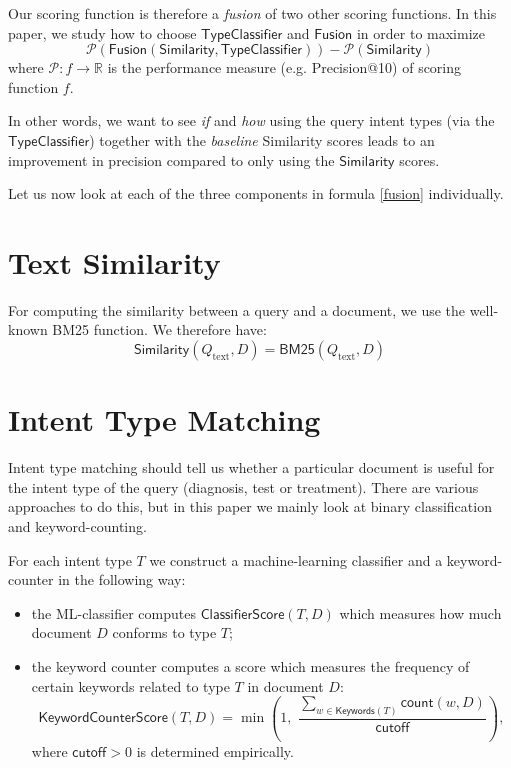 Our scoring function is therefore a \emph{fusion} of two other scoring functions.
In this paper, we study how to choose $\textsf{TypeClassifier}$ and $\textsf{Fusion}$ in order to maximize
\[
 \mathcal{P}(\textsf{Fusion}(\textsf{Similarity}, \textsf{TypeClassifier})) - \mathcal{P}(\textsf{Similarity})
\]
where $\mathcal{P}: f \rightarrow \mathbb{R}$ is the performance measure (e.g. Precision@10) of scoring function $f$.

In other words, we want to see \emph{if} and \emph{how} using the query intent types (via the
$\textsf{TypeClassifier}$) together with the \emph{baseline} \textsf{Similarity} scores
leads to an improvement in precision compared to only using the $\textsf{Similarity}$ scores.

Let us now look at each of the three components in formula \ref{fusion} individually.

\section{Text Similarity}
For computing the similarity between a query and a document, we use the well-known BM25 function\cite{bm25}.
We therefore have:
\begin{equation}\label{bm25-formula}
 \textsf{Similarity}(Q_{\text{text}}, D) = \textsf{BM25}(Q_{\text{text}},D)%
\end{equation}


\section{Intent Type Matching}
Intent type matching should tell us whether a particular document is useful for the intent type of the query 
(diagnosis, test or treatment). There are various approaches to do this, but in this paper we mainly look at
binary classification and keyword-counting.

For each intent type $T$ we construct a machine-learning classifier and a keyword-counter in the following way:
\begin{itemize}
 \item the ML-classifier computes $\textsf{ClassifierScore}(T,D)$ which measures how much document $D$ conforms to type $T$;
 \item the keyword counter computes a score which measures the frequency of certain keywords related to type $T$ in document $D$:
 \begin{equation}\label{basic-formula}
  \textsf{KeywordCounterScore}(T,D) = \min\left(1,\,\, \displaystyle\frac{\displaystyle\sum_{w\in \textsf{Keywords}(T)} \textsf{count}(w,D)}{\textsf{cutoff}}\right),
 \end{equation}
  where $\textsf{cutoff} > 0$ is determined empirically.
\end{itemize}

